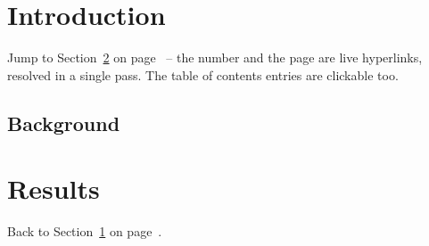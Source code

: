 \documentclass{article}
\begin{document}
\section{Introduction}\label{sec:intro}
Jump to Section~\ref{sec:results} on page~\pageref{sec:results} -- the
number and the page are live hyperlinks, resolved in a single pass.
The table of contents entries are clickable too.
\lipsum[1-3]

\subsection{Background}\label{sub:bg}
\lipsum[1-3]

\section{Results}\label{sec:results}
Back to Section~\ref{sec:intro} on page~\pageref{sec:intro}.
\lipsum[1-2]
\end{document}
